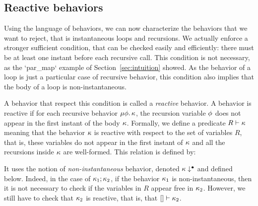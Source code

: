 \documentclass[9pt,preprint]{sigplanconf}
\begin{document}
%
%
%
%
%


\subsection{Reactive behaviors}
\label{sec:reactive_behavior}

Using the language of behaviors, we can now characterize the behaviors that we want to reject, that is instantaneous loops and recursions. We actually enforce a stronger sufficient condition, that can be checked easily and efficiently: there must be at least one instant before each recursive call. This condition is not necessary, as the `par_map` example of Section~\ref{sec:intuition} showed. As the behavior of a loop is just a particular case of recursive behavior, this condition also implies that the body of a loop is non-instantaneous.

A behavior that respect this condition is called a \emph{reactive} behavior. A behavior is reactive if for each recursive behavior $\mu \phi.\, \kappa$, the recursion variable $\phi$ does not appear in the first instant of the body $\kappa$. Formally, we define a predicate $R \vdash \kappa$ meaning that the behavior $\kappa$ is reactive with respect to the set of variables $R$, that is, these variables do not appear in the first instant of $\kappa$ and all the recursions inside $\kappa$ are well-formed. This relation is defined by:

\begin{small}

\end{small}

It uses the notion of \emph{non-instantaneous} behavior, denoted $\kappa\downarrow^{\bullet}$ and defined below. Indeed, in the case of $\kappa_1 ; \kappa_2$, if the behavior $\kappa_1$ is non-instantaneous, then it is not necessary to check if the variables in $R$ appear free in $\kappa_2$. However, we still have to check that $\kappa_2$ is reactive, that is, that $[] \vdash \kappa_2$.

\begin{small}

\end{small}
\end{document}
